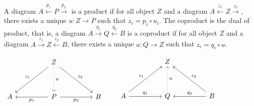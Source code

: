 \documentclass[10pt]{article}
\begin{document}
\begin{hdefinition}[product]
    A diagram $A\xleftarrow{{p}_{1}}P\xrightarrow{{p}_{2}}$ is a product if for all object $Z$ and a diagram $A\xleftarrow{{z}_{1}}Z\xrightarrow{{z}_{2}}$, there exists a unique $u:Z\to P$ such that ${z}_{i}={p}_{i}\circ{u}_{i}$. The coproduct is the dual of product, that is, a diagram $A\xrightarrow{{q}_{1}}Q\xleftarrow{{q}_{2}} B$ is a coproduct if for all object $Z$ and a diagram $A\xrightarrow{{z}_{1}}Z\xleftarrow{{z}_{2}}B$, there exists a unique $u:Q\to Z$ such that ${z}_{i}={q}_{i}\circ u$.
    \begin{center}
        $\begin{tikzcd}
    	&& Z \\
    	\\
    	A && P && B
    	\arrow["{{z}_{1}}"', from=1-3, to=3-1]
    	\arrow["u", dotted, from=1-3, to=3-3]
    	\arrow["{{z}_{2}}", from=1-3, to=3-5]
    	\arrow["{{p}_{1}}", from=3-3, to=3-1]
    	\arrow["{{p}_{2}}"', from=3-3, to=3-5]
        \end{tikzcd}
        \qquad
        \begin{tikzcd}
    	&& Z \\
    	\\
    	A && Q && B
    	\arrow["{{z}_{1}}", from=3-1, to=1-3]
    	\arrow["{{q}_{1}}", from=3-1, to=3-3]
    	\arrow["u"', dotted, from=3-3, to=1-3]
    	\arrow["{{z}_{2}}"', from=3-5, to=1-3]
    	\arrow["{{q}_{2}}"', from=3-5, to=3-3]
        \end{tikzcd}$
    \end{center}
\end{hdefinition}
\end{document}

